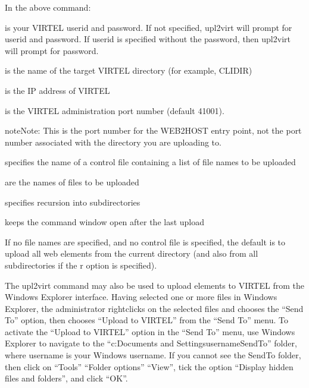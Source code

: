 \documentclass[letterpaper,10pt,english]{sphinxmanual}
\begin{document}
\sphinxAtStartPar
In the above command:
\begin{description}
\sphinxAtStartPar
is your VIRTEL userid and password. If not specified, upl2virt will prompt for userid and password. If userid is specified without the password, then upl2virt will prompt for password.

\sphinxAtStartPar
is the name of the target VIRTEL directory (for example, CLI\sphinxhyphen{}DIR)

\sphinxAtStartPar
is the IP address of VIRTEL

\sphinxAtStartPar
is the VIRTEL administration port number (default 41001).

\end{description}

\begin{sphinxadmonition}{note}{Note:}
\sphinxAtStartPar
This is the port number for the WEB2HOST entry point, not the port number associated with the directory you are uploading to.
\end{sphinxadmonition}
\begin{description}
\sphinxAtStartPar
specifies the name of a control file containing a list of file names to be uploaded

\sphinxAtStartPar
are the names of files to be uploaded

\sphinxAtStartPar
specifies recursion into subdirectories

\sphinxAtStartPar
keeps the command window open after the last upload

\end{description}

\sphinxAtStartPar
If no file names are specified, and no control file is specified, the default is to upload all web elements from the current directory (and also from all subdirectories if the \textendash{}r option is specified).

\ignorespaces 
\sphinxAtStartPar
{}

\sphinxAtStartPar
The upl2virt command may also be used to upload elements to VIRTEL from the Windows Explorer interface. Having selected one or more files in Windows Explorer, the administrator right\sphinxhyphen{}clicks on the selected files and chooses the “Send To” option, then chooses “Upload to VIRTEL” from the “Send To” menu. To activate the “Upload to VIRTEL” option in the “Send To” menu, use Windows Explorer to navigate to the “c:Documents and SettingsusernameSendTo” folder, where username is your Windows username. If you cannot see the SendTo folder, then click on “Tools” \textendash{} “Folder options” \textendash{} “View”, tick the option “Display hidden files and folders”, and click “OK”.
\end{document}
